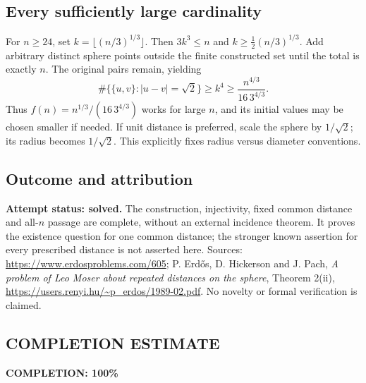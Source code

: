 \subsection*{Every sufficiently large cardinality}
For $n\geq24$, set $k=\lfloor(n/3)^{1/3}\rfloor$. Then $3k^3\leq n$ and $k\geq\tfrac12(n/3)^{1/3}$. Add arbitrary distinct sphere points outside the finite constructed set until the total is exactly $n$. The original pairs remain, yielding
\[\#\{\{u,v\}:|u-v|=\sqrt2\}
\geq k^4\geq\frac{n^{4/3}}{16\,3^{4/3}}.
\]
Thus $f(n)=n^{1/3}/(16\,3^{4/3})$ works for large $n$, and its initial values may be chosen smaller if needed. If unit distance is preferred, scale the sphere by $1/\sqrt2$; its radius becomes $1/\sqrt2$. This explicitly fixes radius versus diameter conventions.

\subsection*{Outcome and attribution}
\textbf{Attempt status: solved.} The construction, injectivity, fixed common distance and all-$n$ passage are complete, without an external incidence theorem. It proves the existence question for one common distance; the stronger known assertion for every prescribed distance is not asserted here.
Sources: \url{https://www.erdosproblems.com/605}; P. Erd\H{o}s, D. Hickerson and J. Pach, \emph{A problem of Leo Moser about repeated distances on the sphere}, Theorem 2(ii), \url{https://users.renyi.hu/~p_erdos/1989-02.pdf}. No novelty or formal verification is claimed.

\subsection*{COMPLETION ESTIMATE}
\textbf{COMPLETION: 100\%}
